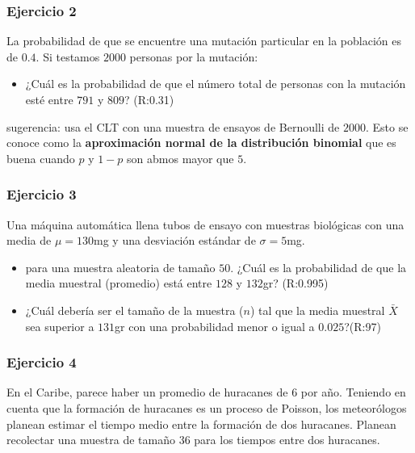 \documentclass[
]{book}
\providecommand{\tightlist}{%
  \setlength{\itemsep}{0pt}\setlength{\parskip}{0pt}}
\begin{document}
\hypertarget{ejercicio-2-8}{%
\subsubsection{Ejercicio 2}\label{ejercicio-2-8}}

La probabilidad de que se encuentre una mutación particular en la población es de \(0.4\). Si testamos \(2000\) personas por la mutación:

\begin{itemize}
\tightlist
\item
  ¿Cuál es la probabilidad de que el número total de personas con la mutación esté entre \(791\) y \(809\)? (R:0.31)
\end{itemize}

sugerencia: usa el CLT con una muestra de ensayos de Bernoulli de \(2000\). Esto se conoce como la \textbf{aproximación normal de la distribución binomial} que es buena cuando \(p\) y \(1-p\) son abmos mayor que \(5\).

\hypertarget{ejercicio-3-5}{%
\subsubsection{Ejercicio 3}\label{ejercicio-3-5}}

Una máquina automática llena tubos de ensayo con muestras biológicas con una media de \(\mu=130\)mg y una desviación estándar de \(\sigma=5\)mg.

\begin{itemize}
\item
  para una muestra aleatoria de tamaño \(50\). ¿Cuál es la probabilidad de que
  la media muestral (promedio) está entre \(128\) y \(132\)gr? (R:0.995)
\item
  ¿Cuál debería ser el tamaño de la muestra (\(n\)) tal que la media muestral \(\bar{X}\) sea superior a \(131\)gr con una probabilidad menor o igual a \(0.025\)?(R:97)
\end{itemize}

\hypertarget{ejercicio-4-3}{%
\subsubsection{Ejercicio 4}\label{ejercicio-4-3}}

En el Caribe, parece haber un promedio de huracanes de \(6\) por año. Teniendo en cuenta que la formación de huracanes es un proceso de Poisson, los meteorólogos planean estimar el tiempo medio entre la formación de dos huracanes. Planean recolectar una muestra de tamaño \(36\) para los tiempos entre dos huracanes.
\end{document}
